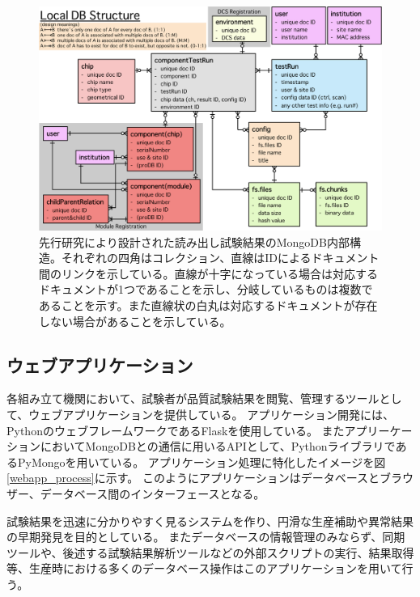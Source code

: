 \begin{figure}[bpt]\centering
\includegraphics[width=12cm]{./localdb_structure_detail.png}
\caption[先行研究により設計された読み出し試験結果のMongoDB内部構造]{先行研究により設計された読み出し試験結果のMongoDB内部構造\cite{4-6}。それぞれの四角はコレクション、直線はIDによるドキュメント間のリンクを示している。直線が十字になっている場合は対応するドキュメントが1つであることを示し、分岐しているものは複数であることを示す。また直線状の白丸は対応するドキュメントが存在しない場合があることを示している。}
\label{localdb_structure_detail}
\end{figure}

\clearpage
\subsection{ウェブアプリケーション} \label{sec:web_app}

各組み立て機関において、試験者が品質試験結果を閲覧、管理するツールとして、ウェブアプリケーションを提供している。
アプリケーション開発には、PythonのウェブフレームワークであるFlaskを使用している。
またアプリーケーションにおいてMongoDBとの通信に用いるAPIとして、PythonライブラリであるPyMongo\cite{4-4}を用いている。
アプリケーション処理に特化したイメージを図\ref{webapp_process}に示す。
このようにアプリケーションはデータベースとブラウザー、データベース間のインターフェースとなる。

試験結果を迅速に分かりやすく見るシステムを作り、円滑な生産補助や異常結果の早期発見を目的としている。
またデータベースの情報管理のみならず、同期ツールや、後述する試験結果解析ツールなどの外部スクリプトの実行、結果取得等、生産時における多くのデータベース操作はこのアプリケーションを用いて行う。


